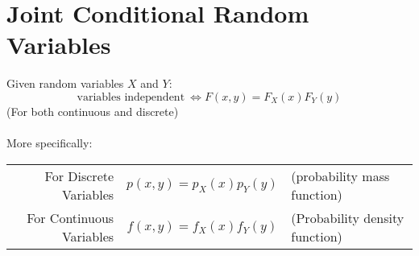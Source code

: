 \documentclass{report}
\begin{document}
    \section*{Joint Conditional Random Variables}
        Given random variables $X$ and $Y$:
        \[\text{variables independent} \ \Leftrightarrow F(x,y) = F_X(x)F_Y(y)\]
        (For both continuous and discrete)
        \\
        \\ More specifically:
        \begin{center}
            \begin{tabular}{r c l}
                For Discrete Variables & $p(x,y) = p_X(x)p_Y(y)$ & (probability mass function) \\
                For Continuous Variables & $f(x,y) = f_X(x)f_Y(y)$ & (Probability density function) \\
            \end{tabular}
        \end{center}
\end{document}
